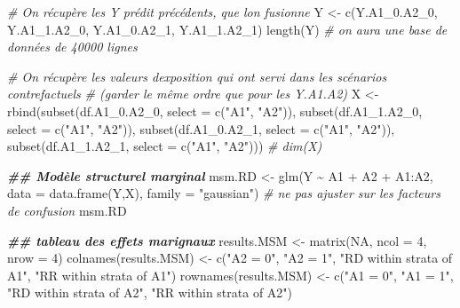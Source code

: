 \documentclass[
]{book}
\newenvironment{Shaded}{\begin{snugshade}}{\end{snugshade}}
\newcommand{\AttributeTok}[1]{\textcolor[rgb]{0.77,0.63,0.00}{#1}}
\newcommand{\CommentTok}[1]{\textcolor[rgb]{0.56,0.35,0.01}{\textit{#1}}}
\newcommand{\ConstantTok}[1]{\textcolor[rgb]{0.00,0.00,0.00}{#1}}
\newcommand{\DecValTok}[1]{\textcolor[rgb]{0.00,0.00,0.81}{#1}}
\newcommand{\DocumentationTok}[1]{\textcolor[rgb]{0.56,0.35,0.01}{\textbf{\textit{#1}}}}
\newcommand{\FunctionTok}[1]{\textcolor[rgb]{0.00,0.00,0.00}{#1}}
\newcommand{\NormalTok}[1]{#1}
\newcommand{\OtherTok}[1]{\textcolor[rgb]{0.56,0.35,0.01}{#1}}
\newcommand{\SpecialCharTok}[1]{\textcolor[rgb]{0.00,0.00,0.00}{#1}}
\newcommand{\StringTok}[1]{\textcolor[rgb]{0.31,0.60,0.02}{#1}}
\begin{document}
\begin{Shaded}
\begin{Highlighting}[]
 \CommentTok{\# On récupère les Y prédit précédents, que l\textquotesingle{}on fusionne}
\NormalTok{    Y }\OtherTok{\textless{}{-}} \FunctionTok{c}\NormalTok{(Y.A1\_0.A2\_0, Y.A1\_1.A2\_0, Y.A1\_0.A2\_1, Y.A1\_1.A2\_1)}
    \FunctionTok{length}\NormalTok{(Y)}
    \CommentTok{\# on aura une base de données de 40000 lignes}

\CommentTok{\# On récupère les valeurs d\textquotesingle{}exposition qui ont servi dans les scénarios contrefactuels}
    \CommentTok{\# (garder le même ordre que pour les Y.A1.A2)}
\NormalTok{    X }\OtherTok{\textless{}{-}} \FunctionTok{rbind}\NormalTok{(}\FunctionTok{subset}\NormalTok{(df.A1\_0.A2\_0, }\AttributeTok{select =} \FunctionTok{c}\NormalTok{(}\StringTok{"A1"}\NormalTok{, }\StringTok{"A2"}\NormalTok{)),}
               \FunctionTok{subset}\NormalTok{(df.A1\_1.A2\_0, }\AttributeTok{select =} \FunctionTok{c}\NormalTok{(}\StringTok{"A1"}\NormalTok{, }\StringTok{"A2"}\NormalTok{)),}
               \FunctionTok{subset}\NormalTok{(df.A1\_0.A2\_1, }\AttributeTok{select =} \FunctionTok{c}\NormalTok{(}\StringTok{"A1"}\NormalTok{, }\StringTok{"A2"}\NormalTok{)),}
               \FunctionTok{subset}\NormalTok{(df.A1\_1.A2\_1, }\AttributeTok{select =} \FunctionTok{c}\NormalTok{(}\StringTok{"A1"}\NormalTok{, }\StringTok{"A2"}\NormalTok{)))}
   \CommentTok{\#  dim(X)}

\DocumentationTok{\#\# Modèle structurel marginal}
\NormalTok{    msm.RD }\OtherTok{\textless{}{-}} \FunctionTok{glm}\NormalTok{(Y }\SpecialCharTok{\textasciitilde{}}\NormalTok{ A1 }\SpecialCharTok{+}\NormalTok{ A2 }\SpecialCharTok{+}\NormalTok{ A1}\SpecialCharTok{:}\NormalTok{A2,}
                  \AttributeTok{data =} \FunctionTok{data.frame}\NormalTok{(Y,X),}
                  \AttributeTok{family =} \StringTok{"gaussian"}\NormalTok{) }\CommentTok{\# ne pas ajuster sur les facteurs de confusion}
\NormalTok{    msm.RD}

\DocumentationTok{\#\# tableau des effets marignaux}
\NormalTok{    results.MSM }\OtherTok{\textless{}{-}} \FunctionTok{matrix}\NormalTok{(}\ConstantTok{NA}\NormalTok{, }\AttributeTok{ncol =} \DecValTok{4}\NormalTok{, }\AttributeTok{nrow =} \DecValTok{4}\NormalTok{)}
    \FunctionTok{colnames}\NormalTok{(results.MSM) }\OtherTok{\textless{}{-}} \FunctionTok{c}\NormalTok{(}\StringTok{"A2 = 0"}\NormalTok{, }\StringTok{"A2 = 1"}\NormalTok{,}
                               \StringTok{"RD within strata of A1"}\NormalTok{,}
                               \StringTok{"RR within strata of A1"}\NormalTok{)}
    \FunctionTok{rownames}\NormalTok{(results.MSM) }\OtherTok{\textless{}{-}} \FunctionTok{c}\NormalTok{(}\StringTok{"A1 = 0"}\NormalTok{, }\StringTok{"A1 = 1"}\NormalTok{,}
                               \StringTok{"RD within strata of A2"}\NormalTok{,}
                               \StringTok{"RR within strata of A2"}\NormalTok{)}


\end{Highlighting}
\end{Shaded}
\end{document}
